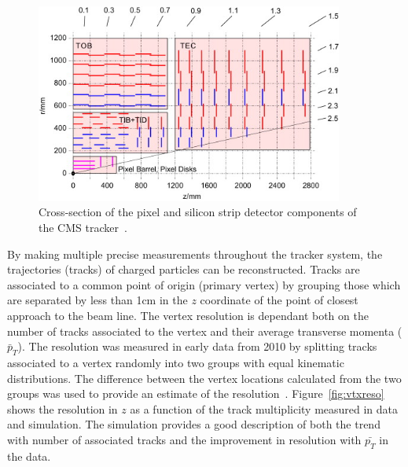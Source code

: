 \begin{figure}
	\centering
	\includegraphics[width=0.9\textwidth]{detector/trcker/tracker_col.jpg}
	\caption{Cross-section of the pixel and silicon strip detector 
	components of the CMS tracker~\citep{Weber201159}.}
   \label{fig:trackergeom}
\end{figure}

By making multiple precise measurements throughout the tracker system, the trajectories (tracks) of charged 
particles can be reconstructed.
Tracks are associated to a common point of origin (primary vertex) by grouping those which are separated
by less than 1cm in the $z$ coordinate of the point of closest approach to the beam line.
The vertex resolution is dependant both on the number of tracks associated to the vertex and
their average transverse momenta ($\bar{p}_{T}$). The resolution was measured in early data from 2010
by splitting tracks associated to a vertex randomly into two groups with equal kinematic distributions.
The difference between the vertex locations calculated from the two groups was used to provide an estimate 
of the resolution~\citep{TRK-10-005}.
Figure~\ref{fig:vtxreso} shows the resolution in $z$ as a function of the track multiplicity
measured in data and simulation. The simulation provides a good description of both the trend with 
number of associated tracks and the improvement in resolution with $\bar{p_{T}}$ in the data. 

